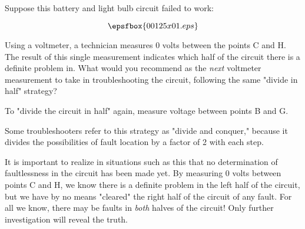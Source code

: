 

Suppose this battery and light bulb circuit failed to work:

$$\epsfbox{00125x01.eps}$$

Using a voltmeter, a technician measures 0 volts between the points C and H.  The result of this single measurement indicates which half of the circuit there is a definite problem in.  What would you recommend as the {\it next} voltmeter measurement to take in troubleshooting the circuit, following the same "divide in half" strategy?







To "divide the circuit in half" again, measure voltage between points B and G.







Some troubleshooters refer to this strategy as "divide and conquer," because it divides the possibilities of fault location by a factor of 2 with each step.  

It is important to realize in situations such as this that no determination of faultlessness in the circuit has been made yet.  By measuring 0 volts between points C and H, we know there is a definite problem in the left half of the circuit, but we have by no means "cleared" the right half of the circuit of any fault.  For all we know, there may be faults in {\it both} halves of the circuit!  Only further investigation will reveal the truth.




